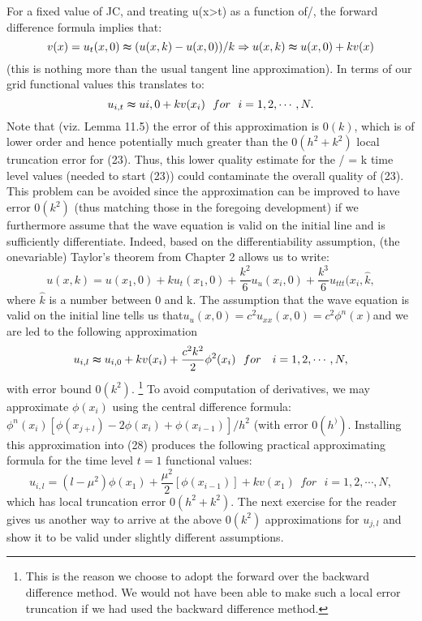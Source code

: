 \documentclass[../main.tex]{subfiles}
\begin{document}
{{For a fixed value of JC, and treating u(x>t) as a function of/, the forward difference 
formula implies that:
$$v(x)=u_t(x,0)\thickapprox (u(x,k)-u(x,0))/k\Rightarrow u(x,k) \thickapprox u(x,0)+kv(x)$$
(this is nothing more than the usual tangent line approximation). In terms of our 
grid functional values this translates to: 
\begin{equation}
	u_{i,t} \thickapprox u{i,0}+kv(x_i) ~~for~~i=1,2,\cdots,N.
\end{equation}
Note that (viz. Lemma 11.5) the error of this approximation is $0(k)$, which is of lower order and hence potentially much greater than the $0(h^2+k^2)$ local truncation error for (23). Thus, this lower quality estimate for the / = k time level values (needed to start (23)) could contaminate the overall quality of (23). This problem can be avoided since the approximation can be improved to have error $0(k^2)$ (thus matching those in the foregoing development) if we furthermore assume that the wave equation is valid on the initial line and is sufficiently differentiate. Indeed, based on the differentiability assumption, (the onevariable) Taylor's theorem from Chapter 2 allows us to write: 
$$
u(x,k)=u(x_1,0)+ku_t(x_1,0)+\dfrac{k^2}{6}u_u(x_i,0)+\dfrac{k^3}{6} u_{ttt}(x_i, \hat{k},
$$
where $\hat{k}$ is a number between 0 and k. The assumption that the wave equation is 
valid on the initial line tells us that$ u_u(x,0)=c^2u_{xx}(x,0)=c^2\phi^n(x) $and we are led to the following approximation
\begin{equation}
	u_{i,l}\thickapprox u_{i,0}+kv(x_i)+\dfrac{c^2k^2}{2}\phi^2(x_i) ~~for ~~~i=1,2,\cdots,N,
\end{equation}
with error bound $0(k^2)$.
\footnote{This is the reason we choose to adopt the forward over the backward difference method. We would 
not have been able to make such a local error truncation if we had used the backward difference 
method.}
To avoid computation of derivatives, we may approximate 
$\phi(x_i)$ using the central difference formula: 
$\phi^n(x_i)[\phi (x_{j+l} ) -2\phi(x_i)+\phi(x_{i-1})]/h^2$
(with error $0(h^))$. Installing this approximation into (28) produces the following practical approximating formula for the time level $t = 1$ functional values: 
\begin{equation}
	u_{i,l}=(l-\mu^2)\phi(x_1)+\dfrac{\mu^2}{2}[\phi(x_{i-1})]+kv(x_1)
	 ~~for ~~~i=1,2,\cdots,N,
\end{equation}
which has local truncation error $0(h^2+k^2)$. The next exercise for the reader gives us another way to arrive at the above $0(k^2)$ approximations for $u_{j,l}$ and show it to be valid under slightly different assumptions. 
}}
\end{document}
